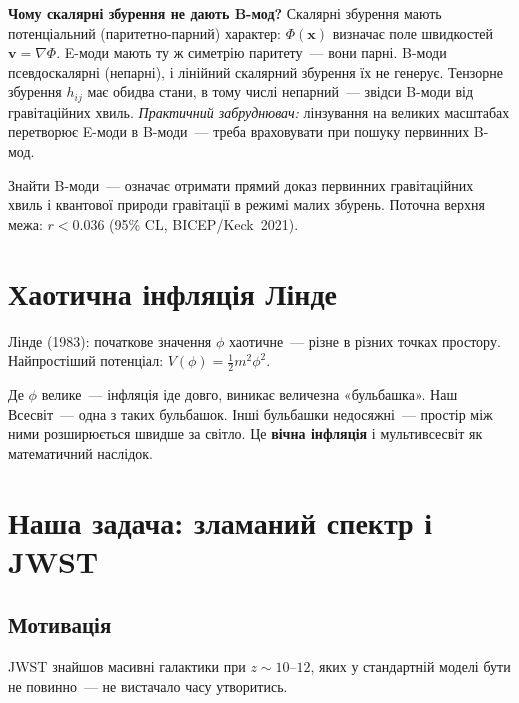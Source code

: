 \documentclass[12pt, a4paper]{article}
\begin{document}
\begin{keybox}
\textbf{Чому скалярні збурення не дають B-мод?}
Скалярні збурення мають потенціальний (паритетно-парний) характер:
$\Phi(\mathbf{x})$ визначає поле швидкостей $\mathbf{v} = \nabla\Phi$.
E-моди мають ту ж симетрію паритету~--- вони парні.
B-моди псевдоскалярні (непарні), і лінійний скалярний збурення їх не генерує.
Тензорне збурення $h_{ij}$ має обидва стани, в тому числі непарний~---
звідси B-моди від гравітаційних хвиль.
\textit{Практичний забруднювач:} лінзування на великих масштабах перетворює
E-моди в B-моди~--- треба враховувати при пошуку первинних B-мод.
\end{keybox}

Знайти B-моди~--- означає отримати прямий доказ первинних гравітаційних хвиль
і квантової природи гравітації в режимі малих збурень.
Поточна верхня межа: $r < 0.036$ (95\% CL, BICEP/Keck~2021).

\section{Хаотична інфляція Лінде}

Лінде (1983): початкове значення $\phi$ хаотичне~--- різне в різних точках простору.
Найпростіший потенціал: $V(\phi) = \frac{1}{2}m^2\phi^2$.

Де $\phi$ велике~--- інфляція іде довго, виникає величезна «бульбашка».
Наш Всесвіт~--- одна з таких бульбашок. Інші бульбашки недосяжні~---
простір між ними розширюється швидше за світло.
Це \textbf{вічна інфляція} і мультивсесвіт як математичний наслідок.

\section{Наша задача: зламаний спектр і JWST}

\subsection{Мотивація}

JWST знайшов масивні галактики при $z \sim 10$--$12$, яких у стандартній
моделі бути не повинно~--- не вистачало часу утворитись.
\end{document}
